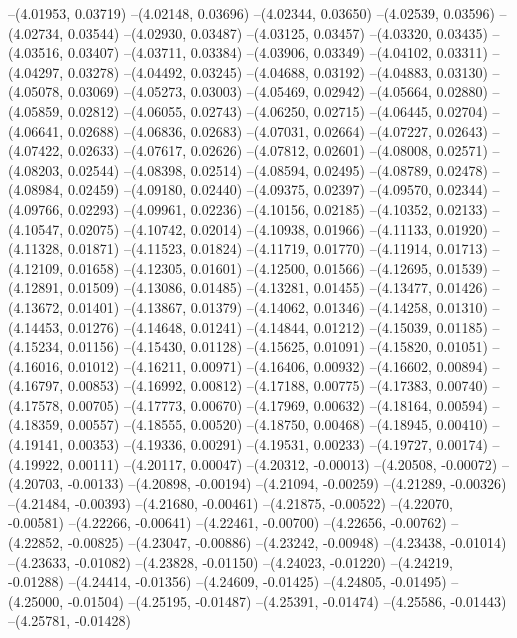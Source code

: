 --(4.01953, 0.03719)
--(4.02148, 0.03696)
--(4.02344, 0.03650)
--(4.02539, 0.03596)
--(4.02734, 0.03544)
--(4.02930, 0.03487)
--(4.03125, 0.03457)
--(4.03320, 0.03435)
--(4.03516, 0.03407)
--(4.03711, 0.03384)
--(4.03906, 0.03349)
--(4.04102, 0.03311)
--(4.04297, 0.03278)
--(4.04492, 0.03245)
--(4.04688, 0.03192)
--(4.04883, 0.03130)
--(4.05078, 0.03069)
--(4.05273, 0.03003)
--(4.05469, 0.02942)
--(4.05664, 0.02880)
--(4.05859, 0.02812)
--(4.06055, 0.02743)
--(4.06250, 0.02715)
--(4.06445, 0.02704)
--(4.06641, 0.02688)
--(4.06836, 0.02683)
--(4.07031, 0.02664)
--(4.07227, 0.02643)
--(4.07422, 0.02633)
--(4.07617, 0.02626)
--(4.07812, 0.02601)
--(4.08008, 0.02571)
--(4.08203, 0.02544)
--(4.08398, 0.02514)
--(4.08594, 0.02495)
--(4.08789, 0.02478)
--(4.08984, 0.02459)
--(4.09180, 0.02440)
--(4.09375, 0.02397)
--(4.09570, 0.02344)
--(4.09766, 0.02293)
--(4.09961, 0.02236)
--(4.10156, 0.02185)
--(4.10352, 0.02133)
--(4.10547, 0.02075)
--(4.10742, 0.02014)
--(4.10938, 0.01966)
--(4.11133, 0.01920)
--(4.11328, 0.01871)
--(4.11523, 0.01824)
--(4.11719, 0.01770)
--(4.11914, 0.01713)
--(4.12109, 0.01658)
--(4.12305, 0.01601)
--(4.12500, 0.01566)
--(4.12695, 0.01539)
--(4.12891, 0.01509)
--(4.13086, 0.01485)
--(4.13281, 0.01455)
--(4.13477, 0.01426)
--(4.13672, 0.01401)
--(4.13867, 0.01379)
--(4.14062, 0.01346)
--(4.14258, 0.01310)
--(4.14453, 0.01276)
--(4.14648, 0.01241)
--(4.14844, 0.01212)
--(4.15039, 0.01185)
--(4.15234, 0.01156)
--(4.15430, 0.01128)
--(4.15625, 0.01091)
--(4.15820, 0.01051)
--(4.16016, 0.01012)
--(4.16211, 0.00971)
--(4.16406, 0.00932)
--(4.16602, 0.00894)
--(4.16797, 0.00853)
--(4.16992, 0.00812)
--(4.17188, 0.00775)
--(4.17383, 0.00740)
--(4.17578, 0.00705)
--(4.17773, 0.00670)
--(4.17969, 0.00632)
--(4.18164, 0.00594)
--(4.18359, 0.00557)
--(4.18555, 0.00520)
--(4.18750, 0.00468)
--(4.18945, 0.00410)
--(4.19141, 0.00353)
--(4.19336, 0.00291)
--(4.19531, 0.00233)
--(4.19727, 0.00174)
--(4.19922, 0.00111)
--(4.20117, 0.00047)
--(4.20312, -0.00013)
--(4.20508, -0.00072)
--(4.20703, -0.00133)
--(4.20898, -0.00194)
--(4.21094, -0.00259)
--(4.21289, -0.00326)
--(4.21484, -0.00393)
--(4.21680, -0.00461)
--(4.21875, -0.00522)
--(4.22070, -0.00581)
--(4.22266, -0.00641)
--(4.22461, -0.00700)
--(4.22656, -0.00762)
--(4.22852, -0.00825)
--(4.23047, -0.00886)
--(4.23242, -0.00948)
--(4.23438, -0.01014)
--(4.23633, -0.01082)
--(4.23828, -0.01150)
--(4.24023, -0.01220)
--(4.24219, -0.01288)
--(4.24414, -0.01356)
--(4.24609, -0.01425)
--(4.24805, -0.01495)
--(4.25000, -0.01504)
--(4.25195, -0.01487)
--(4.25391, -0.01474)
--(4.25586, -0.01443)
--(4.25781, -0.01428)
